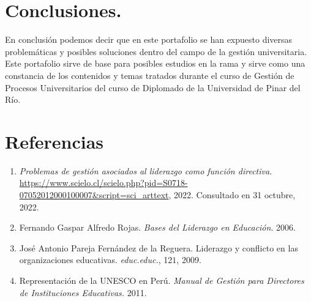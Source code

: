 \documentclass{article}
\begin{document}
\section*{\color{uprgreen} Conclusiones.}
\label{sec:CON}
{\justifying\fontsize{13}{18}\large En conclusión podemos decir que en este portafolio se han expuesto diversas problemáticas y posibles soluciones dentro del campo de la gestión universitaria.} Este portafolio sirve de base para posibles estudios en la rama y sirve como una constancia de los contenidos y temas tratados durante el curso de Gestión de Procesos Universitarios del curso de Diplomado de la Universidad de Pinar del Río. 

\section*{\color{uprgreen} Referencias}
\label{sec:REF}
\begin{enumerate}
	\item[\text{$[1]$}]\label{PGL} {\it Problemas de gestión asociados al liderazgo como función directiva.} \href{https://www.scielo.cl/scielo.php?pid=S0718-07052012000100007\&script=sci\_arttext}{https://www.scielo.cl/scielo.php?pid=S0718-07052012000100007\&script=sci\_arttext}, 2022. Consultado en 31 octubre, 2022.
	\item [\text{$[2]$}]\label{BLE} Fernando Gaspar Alfredo Rojas. {\it Bases del Liderazgo en Educación}. 2006.
	\item [\text{$[3]$}]\label{educ} José Antonio Pareja Fernández de la Reguera. Liderazgo y conflicto en las organizaciones educativas. {\it educ.educ.}, 12\(1\), 2009.
	\item [\text{$[4]$}]\label{RUP} Representación de la UNESCO en Perú. {\it Manual de Gestión para Directores de Instituciones Educativas.} 2011.
\end{enumerate}
\end{document}
